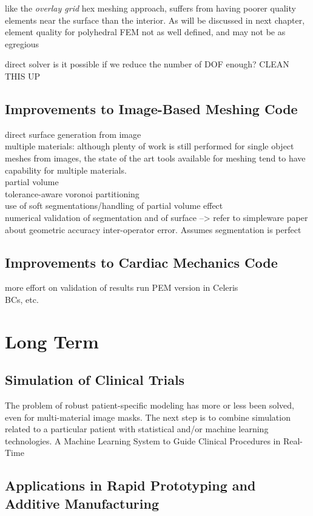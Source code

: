 like the \textit{overlay grid} hex meshing approach, suffers from having poorer quality elements near the surface than the interior. As will be discussed in next chapter, element quality for polyhedral FEM not as well defined, and may not be as egregious

direct solver is it possible if we reduce the number of DOF enough?
CLEAN THIS UP


\subsection{Improvements to Image-Based Meshing Code}
\label{Improvements to Image-Based Meshing Code}
direct surface generation from image \\
multiple materials: although plenty of work is still performed for single object meshes from images, the state of the art tools available for meshing tend to have capability for multiple materials.  \\
partial volume \\
tolerance-aware voronoi partitioning \\
use of soft segmentations/handling of partial volume effect  \\
numerical validation of segmentation and of surface --> refer to simpleware paper about geometric accuracy
inter-operator error. Assumes segmentation is perfect

\subsection{Improvements to Cardiac Mechanics Code}
\label{Improvements to Cardiac Mechanics Code}
more effort on validation of results
run PEM version in Celeris \\
BCs, etc.

\section{Long Term}
\label{Long Term}

\subsection{Simulation of Clinical Trials}
\label{Simulation of Clinical Trials}
The problem of robust patient-specific modeling has more or less been solved, even for multi-material image masks. The next step is to combine simulation related to a particular patient with statistical and/or machine learning technologies. 
A Machine Learning System to Guide Clinical Procedures in Real-Time

\subsection[Applications in Rapid Prototyping and Additive Manufacturing]{\texorpdfstring{Applications in Rapid Prototyping and Additive \newline Manufacturing}{Applications in Rapid Prototyping and Additive \newline Manufacturing}}
\label{Applications in Rapid Prototyping and Additive Manufacturing}



